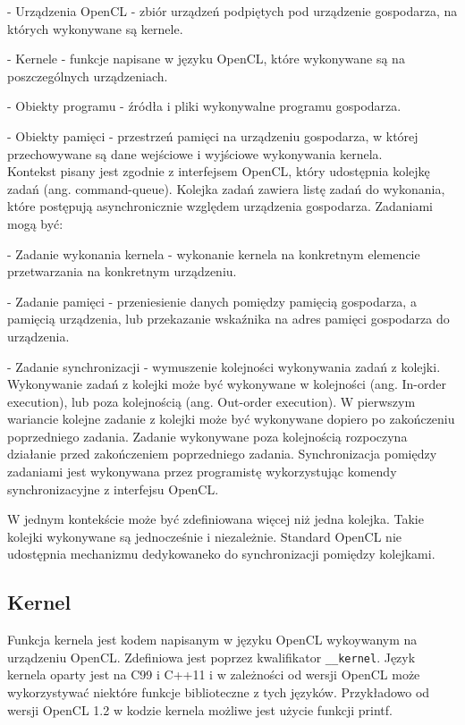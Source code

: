 - Urządzenia OpenCL - zbiór urządzeń podpiętych pod urządzenie gospodarza, na których wykonywane są kernele.

- Kernele - funkcje napisane w języku OpenCL, które wykonywane są na poszczególnych urządzeniach.

- Obiekty programu - źródła i pliki wykonywalne programu gospodarza.

- Obiekty pamięci - przestrzeń pamięci na urządzeniu gospodarza, w której przechowywane są dane wejściowe i wyjściowe wykonywania kernela.\\

Kontekst pisany jest zgodnie z interfejsem OpenCL, który udostępnia kolejkę zadań (ang. command-queue). Kolejka zadań zawiera listę zadań do wykonania, które postępują asynchronicznie względem urządzenia gospodarza. Zadaniami mogą być:

- Zadanie wykonania kernela - wykonanie kernela na konkretnym elemencie przetwarzania na konkretnym urządzeniu.

- Zadanie pamięci - przeniesienie danych pomiędzy pamięcią gospodarza, a pamięcią urządzenia, lub przekazanie wskaźnika na adres pamięci gospodarza do urządzenia.

- Zadanie synchronizacji - wymuszenie kolejności wykonywania zadań z kolejki.\\

Wykonywanie zadań z kolejki może być wykonywane w kolejności (ang. In-order execution), lub poza kolejnością (ang. Out-order execution). W pierwszym wariancie kolejne zadanie z kolejki może być wykonywane dopiero po zakończeniu poprzedniego zadania. Zadanie wykonywane poza kolejnością rozpoczyna działanie przed zakończeniem poprzedniego zadania. Synchronizacja pomiędzy zadaniami jest wykonywana przez programistę wykorzystując komendy synchronizacyjne z interfejsu OpenCL.

W jednym kontekście może być zdefiniowana więcej niż jedna kolejka. Takie kolejki wykonywane są jednocześnie i niezależnie. Standard OpenCL nie udostępnia mechanizmu dedykowaneko do synchronizacji pomiędzy kolejkami.


\subsection{Kernel}\label{sec:OpenC4L}

Funkcja kernela jest kodem napisanym w języku OpenCL wykoywanym na urządzeniu OpenCL. Zdefiniowa jest poprzez kwalifikator \verb|__kernel|. Język kernela oparty jest na C99 i C++11 i w zależności od wersji OpenCL może wykorzystywać niektóre funkcje biblioteczne z tych języków. Przykładowo od wersji OpenCL 1.2 w kodzie kernela możliwe jest użycie funkcji printf.


